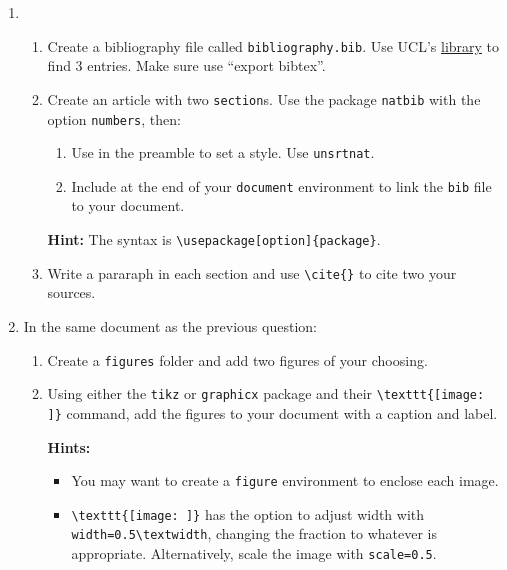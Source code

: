\begin{enumerate}
    \item \begin{enumerate}
        \item 
            Create a bibliography file called \texttt{bibliography.bib}. Use UCL's \href{https://ucl-new-primo.hosted.exlibrisgroup.com/primo-explore/search?vid=UCL_VU2}{library} to find 3 entries. Make sure use ``export bibtex''.
        \item Create an article with two \texttt{section}s. Use the package \texttt{natbib} with the option \texttt{numbers}, then:
        
        \begin{enumerate}
            \item Use \verb|| in the preamble to set a style. Use \texttt{unsrtnat}.
            \item Include \verb|| at the end of your \texttt{document} environment to link the \texttt{bib} file to your document.
        \end{enumerate} 
        \textbf{Hint:} The syntax is \verb|\usepackage[option]{package}|.
        
        \item Write a pararaph in each section and use \verb|\cite{}| to cite two your sources.
    \end{enumerate}
    \item In the same document as the previous question:
    \begin{enumerate}
        \item Create a \verb|figures| folder and add two figures of your choosing.
        \item Using either the \texttt{tikz} or \texttt{graphicx} package and their \verb|\texttt{[image: ]}| command, add the figures to your document with a caption and label.
        
        \textbf{Hints:} \begin{itemize}
            \item You may want to create a \texttt{figure} environment to enclose each image.
            \item \verb|\texttt{[image: ]}| has the option to adjust width with \verb|width=0.5\textwidth|, changing the fraction to whatever is appropriate. Alternatively, scale the image with \verb|scale=0.5|.
        \end{itemize}
    \end{enumerate}
\end{enumerate}